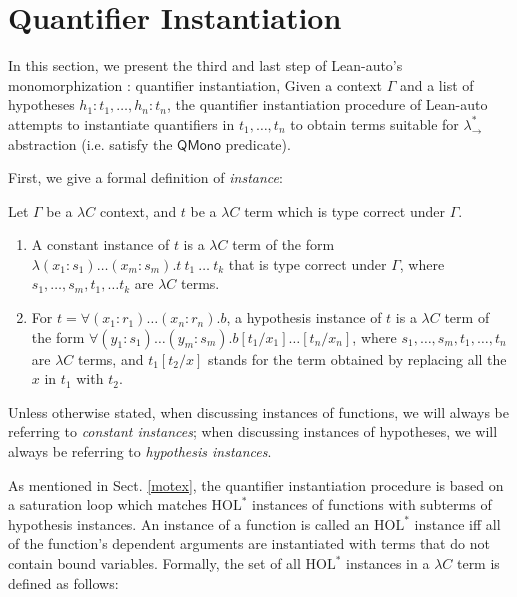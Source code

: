 \section{Quantifier Instantiation}\label{sectinst}
In this section, we present the third and last step of Lean-auto's monomorphization : quantifier instantiation,
Given a context $\Gamma$ and a list of hypotheses $h_1 : t_1, \dots, h_n : t_n$, the quantifier
instantiation procedure of Lean-auto attempts to instantiate quantifiers in
$t_1, \dots, t_n$ to obtain terms suitable for $\lambda_\to^*$ abstraction (i.e. satisfy the $\mathsf{QMono}$ predicate).

First, we give a formal definition of \textit{instance}:

\begin{definition}
  Let $\Gamma$ be a $\lambda C$ context, and $t$ be a $\lambda C$ term which is type correct under $\Gamma$.
  \begin{enumerate}
    \item A constant instance of $t$ is a $\lambda C$ term of the
      form $\lambda (x_1 : s_1) \dots (x_m : s_m). t \ t_1 \ \dots \ t_k$ that is
      type correct under $\Gamma$, where $s_1, \dots, s_m, t_1, \dots t_k$ are $\lambda C$ terms.
    \item For $t = \forall (x_1 : r_1) \dots (x_n : r_n). b$, a hypothesis instance of
      $t$ is a $\lambda C$ term of the form $\forall (y_1 : s_1) \dots (y_m : s_m). b[t_1/x_1]\dots[t_n/x_n]$,
      where $s_1, \dots, s_m, t_1, \dots, t_n$ are $\lambda C$ terms, and $t_1[t_2/x]$ stands
      for the term obtained by replacing all the $x$ in $t_1$ with $t_2$.
  \end{enumerate}
\end{definition}

Unless otherwise stated, when discussing instances of functions, we will always be
referring to \textit{constant instances}; when discussing instances of hypotheses, we will
always be referring to \textit{hypothesis instances}.

As mentioned in Sect. \ref{motex}, the quantifier instantiation procedure
is based on a saturation loop which matches $\text{HOL}^*$ instances of functions
with subterms of hypothesis instances. An instance of a function is called
an $\text{HOL}^*$ instance iff all of the function's dependent arguments are instantiated with terms
that do not contain bound variables. Formally, the set of all $\text{HOL}^*$ instances
in a $\lambda C$ term is defined as follows:

